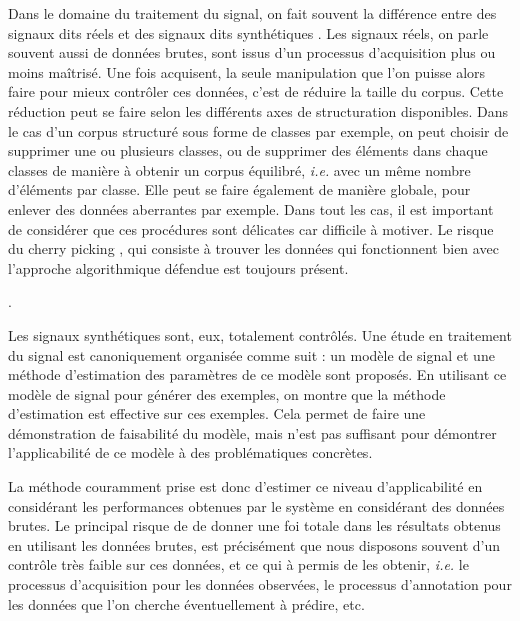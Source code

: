   Dans le domaine du traitement du signal, on fait souvent la différence entre des signaux dits \og réels \fg et des signaux dits \og synthétiques \fg. Les signaux réels, on parle souvent aussi de données brutes, sont issus d'un processus d'acquisition plus ou moins maîtrisé. Une fois acquisent, la seule manipulation que l'on puisse alors faire pour mieux contrôler ces données, c'est de réduire la taille du corpus. Cette réduction peut se faire selon les différents axes de structuration disponibles. Dans le cas d'un corpus structuré sous forme de classes par exemple, on peut choisir de supprimer une ou plusieurs classes, ou de supprimer des éléments dans chaque classes de manière à obtenir un corpus équilibré, \textit{i.e.} avec un même nombre d'éléments par classe. Elle peut se faire également de manière globale, pour enlever des données aberrantes par exemple. Dans tout les cas, il est important de considérer que ces procédures sont délicates car difficile à motiver. Le risque du \og cherry picking \fg, qui consiste à trouver les données qui fonctionnent bien avec l'approche algorithmique défendue est toujours présent.

  .

  Les signaux synthétiques sont, eux, totalement contrôlés. Une étude en traitement du signal est canoniquement organisée comme suit : un modèle de signal et une méthode d'estimation des paramètres de ce modèle sont proposés. En utilisant ce modèle de signal pour générer des exemples, on montre que la méthode d'estimation est effective sur ces exemples. Cela permet de faire une démonstration de faisabilité du modèle, mais n'est pas suffisant pour démontrer l'applicabilité de ce modèle à des problématiques concrètes.

  La méthode couramment prise est donc d'estimer ce niveau d'applicabilité en considérant les performances obtenues par le système en considérant des données brutes. Le principal risque de de donner une foi totale dans les résultats obtenus en utilisant les données brutes, est précisément que nous disposons souvent d'un contrôle très faible sur ces données, et ce qui à permis de les obtenir, \textit{i.e.} le processus d'acquisition pour les données observées, le processus d'annotation pour les données que l'on cherche éventuellement à prédire, etc.

